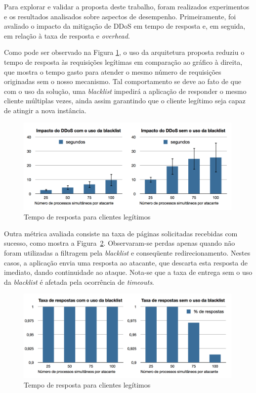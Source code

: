 
Para explorar e validar a proposta deste trabalho, foram realizados experimentos e os resultados analisados sobre aspectos de desempenho. Primeiramente, foi avaliado o impacto da mitigação de DDoS em tempo de resposta e, em seguida, em relação à taxa de resposta e \emph{overhead}. 

Como pode ser observado na Figura \ref{fig:blacklistSecs}, o uso da arquitetura proposta reduziu o tempo de resposta às requisições legítimas em comparação ao gráfico à direita, que mostra o tempo gasto para atender o mesmo número de requisições originadas sem o nosso mecanismo. Tal comportamento se deve ao fato de que com o uso da solução, uma \emph{blacklist} impedirá a aplicação de responder o mesmo cliente múltiplas vezes, ainda assim garantindo que o cliente legítimo seja capaz de atingir a nova instância.

\begin{figure}[h!]
\centering
\includegraphics[width=0.99\textwidth]{images/blacklistSecs.png}
\caption{Tempo de resposta para clientes legítimos}
\label{fig:blacklistSecs}
\end{figure}




Outra métrica avaliada consiste na taxa de páginas solicitadas recebidas com sucesso, como mostra a Figura~\ref{fig:blacklistTxResp}. Observaram-se  perdas apenas quando não foram utilizadas a filtragem pela \emph{blacklist} e conseqüente redirecionamento. Nestes casos, a aplicação envia uma resposta ao atacante, que descarta esta resposta de imediato, dando continuidade ao ataque. Nota-se que a taxa de entrega sem o uso da \emph{blacklist} é afetada pela ocorrência de \emph{timeouts}.


\begin{figure}[h!]
\centering
\includegraphics[width=0.99\textwidth]{images/blacklistTxResp.png}
\caption{Tempo de resposta para clientes legítimos}
\label{fig:blacklistTxResp}
\end{figure}

